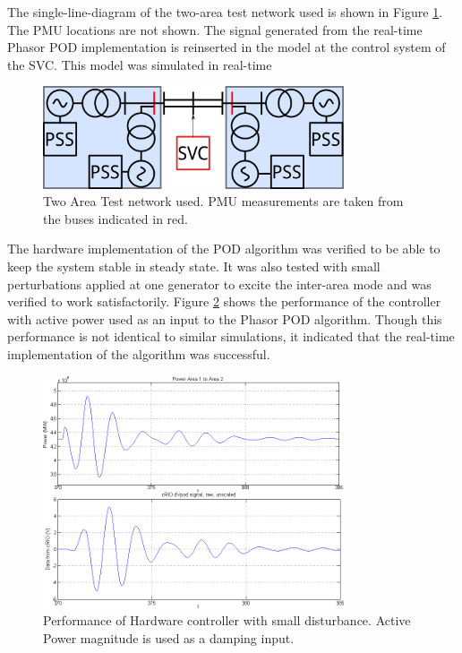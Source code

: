 \documentclass[conference]{IEEEtran}
\begin{document}
The single-line-diagram of the two-area test network used is shown in Figure \ref{Two_area}. The PMU locations are not shown. The signal generated from the real-time Phasor POD implementation is reinserted in the model at the control system of the SVC. This model was simulated in real-time\\

\begin{figure}[!t]
\centering
\includegraphics[width=3.5in]{TwoArea.png} 
\caption{Two Area Test network used. PMU measurements are taken from the buses indicated in red.}
\label{Two_area}
\end{figure}

The hardware implementation of the POD algorithm was verified to be able to keep the system stable in steady state. It was also tested with small perturbations applied at one generator to excite the inter-area mode and was verified to work satisfactorily. Figure \ref{Results} shows the performance of the controller with active power used as an input to the Phasor POD algorithm. Though this performance is not identical to similar simulations, it indicated that the real-time implementation of the algorithm was successful.

\begin{figure}[!t]
\centering
\includegraphics[width=3.5in]{Results.png} 
\caption{Performance of Hardware controller with small disturbance. Active Power magnitude is used as a damping input.}
\label{Results}
\end{figure}
\end{document}
